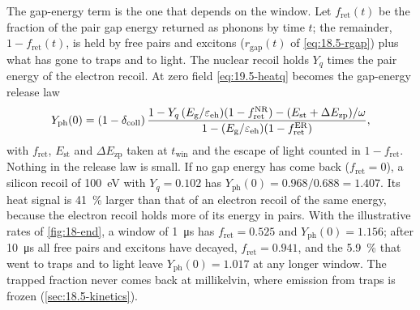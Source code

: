 The gap-energy term is the one that depends on the window. Let $f_{\mathrm{ret}}(t)$ be the fraction of the pair gap energy returned as phonons by time $t$; the remainder, $1 - f_{\mathrm{ret}}(t)$, is held by free pairs and excitons ($r_{\mathrm{gap}}(t)$ of \cref{eq:18.5-rgap}) plus what has gone to traps and to light. The nuclear recoil holds $Y_q$ times the pair energy of the electron recoil. At zero field \cref{eq:19.5-heatq} becomes the gap-energy release law
\begin{equation}
  Y_{\mathrm{ph}}(0) = (1 - \delta_{\mathrm{coll}})\,\frac{1 - Y_q\,(E_{\mathrm{g}}/\varepsilon_{\mathrm{eh}})(1 - f^{\mathrm{NR}}_{\mathrm{ret}}) - (E_{\mathrm{st}} + \Delta E_{\mathrm{zp}})/\omega}{1 - (E_{\mathrm{g}}/\varepsilon_{\mathrm{eh}})(1 - f^{\mathrm{ER}}_{\mathrm{ret}})} ,
  \label{eq:19.5-release}
\end{equation}
with $f_{\mathrm{ret}}$, $E_{\mathrm{st}}$ and $\Delta E_{\mathrm{zp}}$ taken at $t_{\mathrm{win}}$ and the escape of light counted in $1 - f_{\mathrm{ret}}$. Nothing in the release law is small. If no gap energy has come back ($f_{\mathrm{ret}} = 0$), a silicon recoil of \SI{100}{eV} with $Y_q = 0.102$ has $Y_{\mathrm{ph}}(0) = 0.968/0.688 = 1.407$. Its heat signal is \SI{41}{\percent} larger than that of an electron recoil of the same energy, because the electron recoil holds more of its energy in pairs. With the illustrative rates of \cref{fig:18-end}, a window of \SI{1}{\micro s} has $f_{\mathrm{ret}} = 0.525$ and $Y_{\mathrm{ph}}(0) = 1.156$; after \SI{10}{\micro s} all free pairs and excitons have decayed, $f_{\mathrm{ret}} = 0.941$, and the \SI{5.9}{\percent} that went to traps and to light leave $Y_{\mathrm{ph}}(0) = 1.017$ at any longer window. The trapped fraction never comes back at millikelvin, where emission from traps is frozen (\cref{sec:18.5-kinetics}).


